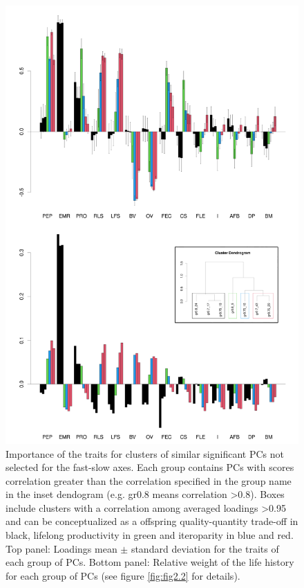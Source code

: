 \begin{figure}
\centering
\includegraphics[width=\textwidth]{./Figures/chapter02/fig3-Secondary axes.png}
\caption[Alternative axes groups and PC loadings]{
Importance of the traits for clusters of similar significant PCs not selected
for the fast-slow axes. Each group contains PCs with scores correlation greater
than the correlation specified in the group name in the inset dendogram (e.g.
gr0.8 means correlation \textgreater{0.8}). Boxes include clusters with a
correlation among averaged loadings \textgreater{0.95} and can be conceptualized
as a offspring quality-quantity trade-off in black, lifelong productivity in
green and iteroparity in blue and red.
Top panel: Loadings mean $\pm$ standard deviation for the traits of each group
of PCs. Bottom panel: Relative weight of the life history for each group of PCs
(see figure \ref{fig:fig2.2} for details).}
\label{fig:fig2.3}
\end{figure}

